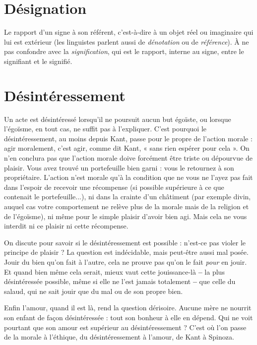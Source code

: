 \section{Désignation}
Le rapport d’un signe à son référent, c’est-à-dire à un objet
réel ou imaginaire qui lui est extérieur (les linguistes parlent
aussi de {\it dénotation} ou de {\it référence}). À ne pas confondre avec la {\it signification},
qui est le rapport, interne au signe, entre le signifiant et le signifié.

\section{Désintéressement}
Un acte est désintéressé lorsqu'il ne poursuit aucun
but égoïste, ou lorsque l’égoïsme, en tout cas, ne
suffit pas à l’expliquer. C’est pourquoi le désintéressement, au moins depuis
Kant, passe pour le propre de l’action morale : agir moralement, c’est agir,
comme dit Kant, « sans rien espérer pour cela ». On n’en conclura pas que
l’action morale doive forcément être triste ou dépourvue de plaisir. Vous avez
trouvé un portefeuille bien garni : vous le retournez à son propriétaire. L'action
n'est morale qu’à la condition que ne vous ne l’ayez pas fait dans l'espoir de
recevoir une récompense (si possible supérieure à ce que contenait le portefeuille...),
ni dans la crainte d’un châtiment (par exemple divin, auquel cas
votre comportement ne relève plus de la morale mais de la religion et de
l’égoïsme), ni même pour le simple plaisir d’avoir bien agi. Mais cela ne vous
interdit ni ce plaisir ni cette récompense.

On discute pour savoir si le désintéressement est possible : n’est-ce pas
violer le principe de plaisir ? La question est indécidable, mais peut-être aussi
mal posée. Jouir du bien qu’on fait à l’autre, cela ne prouve pas qu’on le fait
{\it pour} en jouir. Et quand bien même cela serait, mieux vaut cette jouissance-là
{\bf --} la plus désintéressée possible, même si elle ne l’est jamais totalement {\bf --} que
celle du salaud, qui ne sait jouir que du mal ou de son propre bien.

Enfin l'amour, quand il est là, rend la question dérisoire. Aucune mère ne
nourrit son enfant de façon désintéressée : tout son bonheur à elle en dépend.
Qui ne voit pourtant que son amour est supérieur au désintéressement ? C’est
où l’on passe de la morale à l'éthique, du désintéressement à l’amour, de Kant
à Spinoza.

